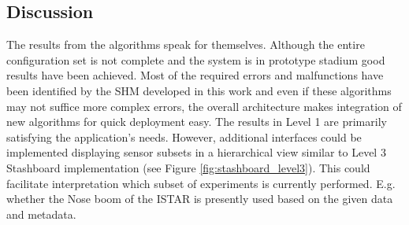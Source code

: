 \subsection{Discussion}
The results from the algorithms speak for themselves. Although the entire configuration set is not complete and the system is in prototype stadium good results have been achieved. Most of the required errors and malfunctions have been identified by the SHM developed in this work and even if these algorithms may not suffice more complex errors, the overall architecture makes integration of new algorithms for quick deployment easy.
The results in Level 1 are primarily satisfying the application's needs. However, additional interfaces could be implemented displaying sensor subsets in a hierarchical view similar to Level 3 Stashboard implementation (see Figure \ref{fig:stashboard_level3}). This could facilitate interpretation which subset of experiments is currently performed. E.g. whether the Nose boom of the ISTAR is presently used based on the given data and metadata.

